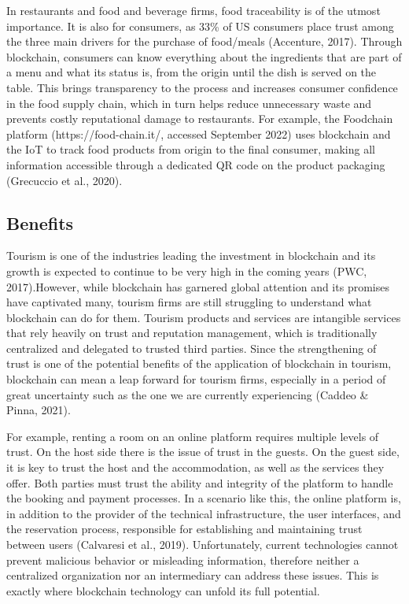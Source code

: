 \documentclass[
  letterpaper,
  DIV=11,
  numbers=noendperiod]{scrreprt}
\begin{document}
In restaurants and food and beverage firms, food traceability is of the
utmost importance. It is also for consumers, as 33\% of US consumers
place trust among the three main drivers for the purchase of food/meals
(Accenture, 2017). Through blockchain, consumers can know everything
about the ingredients that are part of a menu and what its status is,
from the origin until the dish is served on the table. This brings
transparency to the process and increases consumer confidence in the
food supply chain, which in turn helps reduce unnecessary waste and
prevents costly reputational damage to restaurants. For example, the
Foodchain platform (https://food-chain.it/, accessed September 2022)
uses blockchain and the IoT to track food products from origin to the
final consumer, making all information accessible through a dedicated QR
code on the product packaging (Grecuccio et al., 2020).

\hypertarget{benefits-2}{%
\subsection{Benefits}\label{benefits-2}}

Tourism is one of the industries leading the investment in blockchain
and its growth is expected to continue to be very high in the coming
years (PWC, 2017).However, while blockchain has garnered global
attention and its promises have captivated many, tourism firms are still
struggling to understand what blockchain can do for them. Tourism
products and services are intangible services that rely heavily on trust
and reputation management, which is traditionally centralized and
delegated to trusted third parties. Since the strengthening of trust is
one of the potential benefits of the application of blockchain in
tourism, blockchain can mean a leap forward for tourism firms,
especially in a period of great uncertainty such as the one we are
currently experiencing (Caddeo \& Pinna, 2021).

For example, renting a room on an online platform requires multiple
levels of trust. On the host side there is the issue of trust in the
guests. On the guest side, it is key to trust the host and the
accommodation, as well as the services they offer. Both parties must
trust the ability and integrity of the platform to handle the booking
and payment processes. In a scenario like this, the online platform is,
in addition to the provider of the technical infrastructure, the user
interfaces, and the reservation process, responsible for establishing
and maintaining trust between users (Calvaresi et al., 2019).
Unfortunately, current technologies cannot prevent malicious behavior or
misleading information, therefore neither a centralized organization nor
an intermediary can address these issues. This is exactly where
blockchain technology can unfold its full potential.
\end{document}
